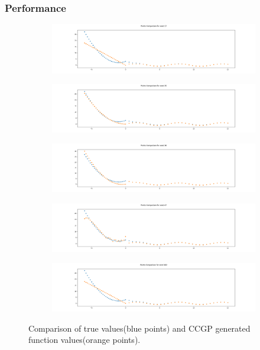 \documentclass{article}
\begin{document}
\clearpage
\subsubsection*{Performance}

\begin{figure}[h!]
	\centering
	\begin{subfigure}[b]{\linewidth}
		\includegraphics[width=\linewidth]{ccgp_chart_17.png}
	\end{subfigure}
\begin{subfigure}[b]{\linewidth}
	\includegraphics[width=\linewidth]{ccgp_chart_35.png}
\end{subfigure}
\begin{subfigure}[b]{\linewidth}
	\includegraphics[width=\linewidth]{ccgp_chart_36.png}
\end{subfigure}
\begin{subfigure}[b]{\linewidth}
	\includegraphics[width=\linewidth]{ccgp_chart_47.png}
\end{subfigure}
\begin{subfigure}[b]{\linewidth}
	\includegraphics[width=\linewidth]{ccgp_chart_162.png}
\end{subfigure}
	\caption{Comparison of true values(blue points) and CCGP generated function values(orange points).}
\end{figure}
\end{document}
